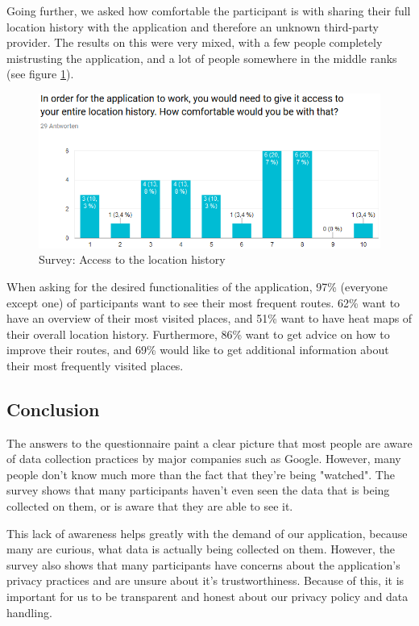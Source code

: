 \documentclass[12p]{article}
\begin{document}
		Going further, we asked how comfortable the participant is with sharing their full location history with the application and therefore an unknown third-party provider. The results on this were very mixed, with a few people completely mistrusting the application, and a lot of people somewhere in the middle ranks (see figure \ref{fig:survey_location_access}).
		
		\begin{figure}[ht]
            \center
            \includegraphics[width=1\textwidth]{survey/survey2}
            \caption{Survey: Access to the location history}
            \label{fig:survey_location_access}
        \end{figure}
        
        When asking for the desired functionalities of the application, 97\% (everyone except one) of participants want to see their most frequent routes. 62\% want to have an overview of their most visited places, and 51\% want to have heat maps of their overall location history. Furthermore, 86\% want to get advice on how to improve their routes, and 69\% would like to get additional information about their most frequently visited places.
		
		\subsection{Conclusion}
		
		The answers to the questionnaire paint a clear picture that most people are aware of data collection practices by major companies such as Google. However, many people don't know much more than the fact that they're being "watched". The survey shows that many participants haven't even seen the data that is being collected on them, or is aware that they are able to see it.
		
		This lack of awareness helps greatly with the demand of our application, because many are curious, what data is actually being collected on them. However, the survey also shows that many participants have concerns about the application's privacy practices and are unsure about it's trustworthiness. Because of this, it is important for us to be transparent and honest about our privacy policy and data handling.
		
\end{document}
